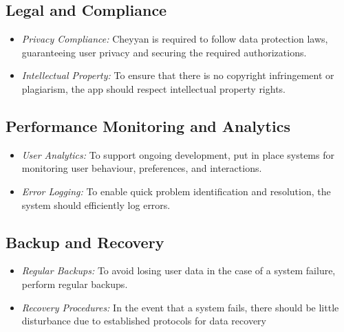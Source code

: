 \documentclass{l4proj}
\begin{document}
\subsection{ Legal and Compliance}
\begin{itemize}
    \item \textit{Privacy Compliance:} Cheyyan is required to follow data protection laws, guaranteeing user privacy and securing the required authorizations.
    \item \textit{Intellectual Property:} To ensure that there is no copyright infringement or plagiarism, the app should respect intellectual property rights.
\end{itemize}

\subsection{Performance Monitoring and Analytics}
\begin{itemize}
    \item \textit{User Analytics:} To support ongoing development, put in place systems for monitoring user behaviour, preferences, and interactions.
    \item \textit{Error Logging:} To enable quick problem identification and resolution, the system should efficiently log errors.
\end{itemize}

\subsection{Backup and Recovery}
\begin{itemize}
    \item \textit{Regular Backups:} To avoid losing user data in the case of a system failure, perform regular backups.
    \item \textit{Recovery Procedures:}  In the event that a system fails, there should be little disturbance due to established protocols for data recovery
\end{itemize}
\end{document}
